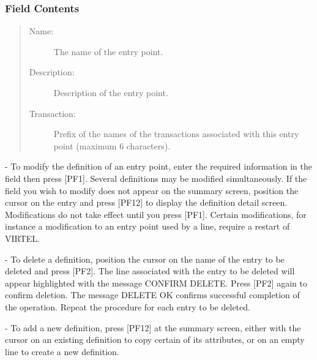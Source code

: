 \documentclass[letterpaper,10pt,english]{sphinxmanual}
\begin{document}


\subsubsection{Field Contents}
\label{\detokenize{connectivity_guide:field-contents}}\begin{quote}
\begin{description}
\item[{Name:}] \leavevmode
The name of the entry point.

\item[{Description:}] \leavevmode
Description of the entry point.

\item[{Transaction:}] \leavevmode
Prefix of the names of the transactions associated with this entry point (maximum 6 characters).

\end{description}
\end{quote}

 - To modify the definition of an entry point, enter the required information in the field then press {[}PF1{]}. Several definitions may be modified simultaneously. If the field you wish to modify does not appear on the summary screen, position the cursor on the entry and press {[}PF12{]} to display the definition detail screen. Modifications do not take effect until you press {[}PF1{]}. Certain modifications, for instance a modification to an entry point used by a line, require a restart of VIRTEL.

 - To delete a definition, position the cursor on the name of the entry to be deleted and press {[}PF2{]}. The line associated with the entry to be deleted will appear highlighted with the message CONFIRM DELETE. Press {[}PF2{]} again to confirm deletion. The message DELETE OK confirms successful completion of the operation. Repeat the procedure for each entry to be deleted.

 - To add a new definition, press {[}PF12{]} at the summary screen, either with the cursor on an existing definition to copy certain of its attributes, or on an empty line to create a new definition.

\end{document}
